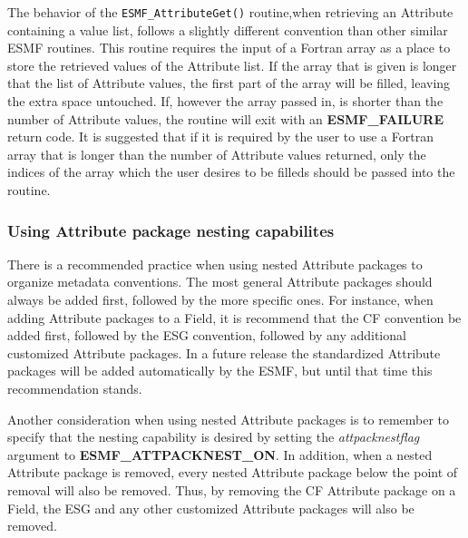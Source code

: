 The behavior of the {\tt ESMF\_AttributeGet()} routine,when retrieving an Attribute containing a value list, follows a slightly different convention than other similar ESMF routines.  This routine requires the input of a Fortran array as a place to store the retrieved values of the Attribute list.  If the array that is given is longer that the list of Attribute values, the first part of the array will be filled, leaving the extra space untouched.  If, however the array passed in, is shorter than the number of Attribute values, the routine will exit with an {\bf ESMF\_FAILURE} return code.  It is suggested that if it is required by the user to use a Fortran array that is longer than the number of Attribute values returned, only the indices of the array which the user desires to be filleds should be passed into the routine.  
  
\subsubsection{Using Attribute package nesting capabilites}

There is a recommended practice when using nested Attribute packages to organize metadata conventions.  The most general Attribute packages should always be added first, followed by the more specific ones.  For instance, when adding Attribute packages to a Field, it is recommend that the CF convention be added first, followed by the ESG convention, followed by any additional customized Attribute packages.  In a future release the standardized Attribute packages will be added automatically by the ESMF, but until that time this recommendation stands.

Another consideration when using nested Attribute packages is to remember to specify that the nesting capability is desired by setting the {\it attpacknestflag} argument to {\bf ESMF\_ATTPACKNEST\_ON}.  In addition, when a nested Attribute package is removed, every nested Attribute package below the point of removal will also be removed.  Thus, by removing the CF Attribute package on a Field, the ESG and any other customized Attribute packages will also be removed.








